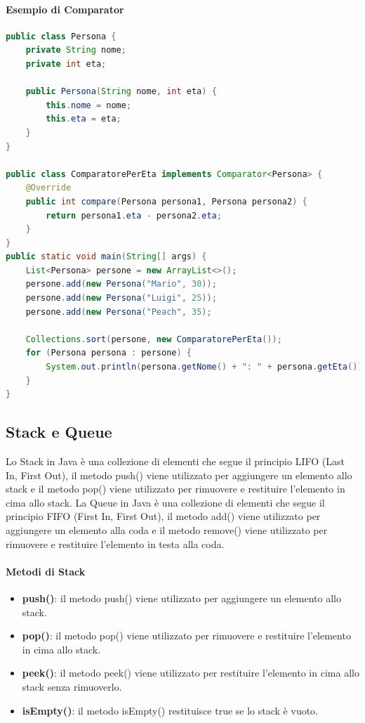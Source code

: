 \documentclass[11pt]{article}
\begin{document}
\paragraph{Esempio di Comparator}
\begin{lstlisting}[language=Java]
public class Persona {
    private String nome;
    private int eta;

    public Persona(String nome, int eta) {
        this.nome = nome;
        this.eta = eta;
    }
}

public class ComparatorePerEta implements Comparator<Persona> {
    @Override
    public int compare(Persona persona1, Persona persona2) {
        return persona1.eta - persona2.eta;
    }
}
public static void main(String[] args) {
    List<Persona> persone = new ArrayList<>();
    persone.add(new Persona("Mario", 30));
    persone.add(new Persona("Luigi", 25));
    persone.add(new Persona("Peach", 35);

    Collections.sort(persone, new ComparatorePerEta());
    for (Persona persona : persone) {
        System.out.println(persona.getNome() + ": " + persona.getEta());
    }
}
\end{lstlisting}
\subsection{Stack e Queue}
Lo Stack in Java è una collezione di elementi che segue il principio LIFO (Last In, First Out),
il metodo push() viene utilizzato per aggiungere un elemento allo stack e il metodo pop() viene utilizzato per rimuovere e restituire l'elemento in cima allo stack.
La Queue in Java è una collezione di elementi che segue il principio FIFO (First In, First Out),
il metodo add() viene utilizzato per aggiungere un elemento alla coda e il metodo remove() viene utilizzato per rimuovere e restituire l'elemento in testa alla coda.
\paragraph{Metodi di Stack}
\begin{itemize}
    \item \textbf{push()}: il metodo push() viene utilizzato per aggiungere un elemento allo stack.
    \item \textbf{pop()}: il metodo pop() viene utilizzato per rimuovere e restituire l'elemento in cima allo stack.
    \item \textbf{peek()}: il metodo peek() viene utilizzato per restituire l'elemento in cima allo stack senza rimuoverlo.
    \item \textbf{isEmpty()}: il metodo isEmpty() restituisce true se lo stack è vuoto.
    \end{itemize}
\end{document}
